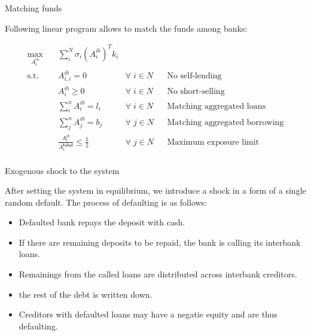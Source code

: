 \documentclass{beamer}
\begin{document}
\begin{frame}{Matching funds}

Following linear program allows to match the funds among banks:

\begin{equation}
    \begin{aligned}
    \max_{A^{ib}_i} \quad & \sum_{i}^{N} \sigma_i (A^{ib}_i)^T k_i\\
    \textrm{s.t.} \quad & A^{ib}_{i,i} = 0 & \forall \; i \in N && \text{No self-lending}\\
      & A^{ib}_i \geq 0 & \forall \; i \in N && \text{No short-selling}\\
      & \sum_i^n A^{ib}_i = l_i & \forall \; i \in N && \text{Matching aggregated loans}\\
      & \sum_j^n A^{ib}_j = b_j & \forall \; j \in N && \text{Matching aggregated borrowing}\\ 
      & \frac{A^{ib}_i}{A^{\textbf{total}}_i} \leq \frac{1}{5} & \forall \; j \in N && \text{Maximum exposure limit}\\ 
    \end{aligned}
  \end{equation}
    
\end{frame}

\begin{frame}{Exogenous shock to the system}

    After setting the system in equilibrium, we introduce a shock in a form of a single random default. The process of defaulting is as follows:

    \begin{itemize}
        \item Defaulted bank repays the deposit with cash.
        \item If there are remaining deposits to be repaid, the bank is calling its interbank loans.
        \item Remainings from the called loans are distributed across interbank creditors.
        \item the rest of the debt is written down.
        \item Creditors with defaulted loans may have a negatie equity and are thus defaulting. 
    \end{itemize}
    
\end{frame}
\end{document}
